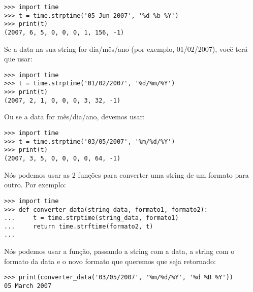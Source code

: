 \begin{listingignore}
\begin{verbatim}
>>> import time
>>> t = time.strptime('05 Jun 2007', '%d %b %Y')
>>> print(t)
(2007, 6, 5, 0, 0, 0, 1, 156, -1)
\end{verbatim}
\end{listingignore}

\noindent
Se a data na sua string for dia/mês/ano (por exemplo, 01/02/2007), vocë terá que usar:

\begin{listingignore}
\begin{verbatim}
>>> import time
>>> t = time.strptime('01/02/2007', '%d/%m/%Y')
>>> print(t)
(2007, 2, 1, 0, 0, 0, 3, 32, -1)
\end{verbatim}
\end{listingignore}

\noindent
Ou se a data for mês/dia/ano, devemos usar:

\begin{listingignore}
\begin{verbatim}
>>> import time
>>> t = time.strptime('03/05/2007', '%m/%d/%Y')
>>> print(t)
(2007, 3, 5, 0, 0, 0, 0, 64, -1)
\end{verbatim}
\end{listingignore}

\noindent
Nós podemos usar as 2 funções para converter uma string de um formato para outro. Por exemplo:

\begin{listing}
\begin{verbatim}
>>> import time
>>> def converter_data(string_data, formato1, formato2):
...     t = time.strptime(string_data, formato1)
...     return time.strftime(formato2, t)
...
\end{verbatim}
\end{listing}

\noindent
Nós podemos usar a função, passando a string com a data, a string com o formato da data e o novo formato que queremos que seja retornado:

\begin{listing}
\begin{verbatim}
>>> print(converter_data('03/05/2007', '%m/%d/%Y', '%d %B %Y'))
05 March 2007
\end{verbatim}
\end{listing}

\newpage
